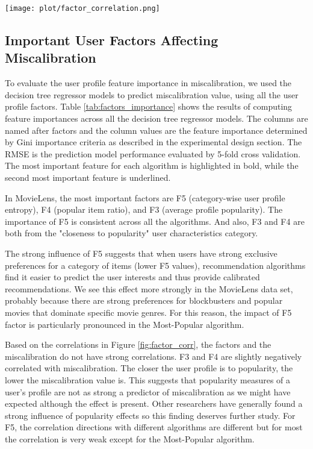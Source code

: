 \begin{figure*}[!hbtp]
    \centering
    \texttt{[image: plot/factor\_correlation.png]}
    \caption{Correlation heatmap of factors and miscalibration from different algorithms}
    \label{fig:factor_corr}
\end{figure*}


\subsection{Important User Factors Affecting Miscalibration}

To evaluate the user profile feature importance in miscalibration, we used the decision tree regressor models to predict miscalibration value, using all the user profile factors. Table \ref{tab:factors_importance} shows the results of computing feature importances across all the decision tree regressor models. The columns are named after factors and the column values are the feature importance determined by Gini importance criteria as described in the experimental design section. The RMSE is the prediction model performance evaluated by 5-fold cross validation. The most important feature for each algorithm is highlighted in bold, while the second most important feature is underlined. 

In MovieLens, the most important factors are F5 (category-wise user profile entropy), F4 (popular item ratio), and F3 (average profile popularity). The importance of F5 is consistent across all the algorithms. And also, F3 and F4 are both from the "closeness to popularity" user characteristics category. 

The strong influence of F5 suggests that when users have strong exclusive preferences for a category of items (lower F5 values), recommendation algorithms find it easier to predict the user interests and thus provide calibrated recommendations. We see this effect more strongly in the MovieLens data set, probably because there are strong preferences for blockbusters and popular movies that dominate specific movie genres. For this reason, the impact of F5 factor is particularly pronounced in the Most-Popular algorithm.

Based on the correlations in Figure \ref{fig:factor_corr}, the factors and the miscalibration do not have strong correlations. F3 and F4 are slightly negatively correlated with miscalibration. The closer the user profile is to popularity, the lower the miscalibration value is. This suggests that popularity measures of a user's profile are not as strong a predictor of miscalibration as we might have expected although the effect is present. Other researchers have generally found a strong influence of popularity effects so this finding deserves further study. For F5, the correlation directions with different algorithms are different but for most the correlation is very weak except for the Most-Popular algorithm.


